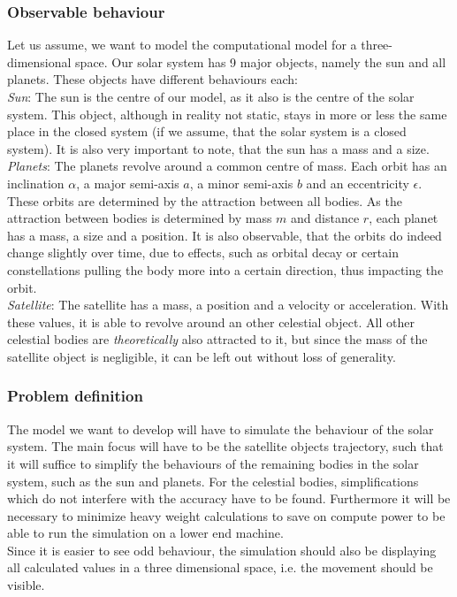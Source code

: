 \documentclass[conference,compsoc]{IEEEtran}
\begin{document}
\subsubsection{Observable behaviour}
\label{observations}
Let us assume, we want to model the computational model for a three-dimensional space. Our solar system has 9 major objects, namely the sun and all planets. These objects have different behaviours each:\\
\emph{Sun}: The sun is the centre of our model, as it also is the centre of the solar system. This object, although in reality not static, stays in more or less the same place in the closed system (if we assume, that the solar system is a closed system). It is also very important to note, that the sun has a mass and a size.\\
\emph{Planets}: The planets revolve around a common centre of mass. Each orbit has an inclination $\alpha$, a major semi-axis $a$, a minor semi-axis $b$ and an eccentricity $\epsilon$. 
These orbits are determined by the attraction between all bodies. As the attraction between bodies is determined by mass $m$ and distance $r$, each planet has a mass, a size and a position. It is also observable, that the orbits do indeed change slightly over time, due to effects, such as orbital decay or certain constellations pulling the body more into a certain direction, thus impacting the orbit.\\
\emph{Satellite}: The satellite has a mass, a position and a velocity or acceleration. With these values, it is able to revolve around an other celestial object. All other celestial bodies are \emph{theoretically} also attracted to it, but since the mass of the satellite object is negligible, it can be left out without loss of generality.
\subsubsection{Problem definition}
\label{Problem-Def}
The model we want to develop will have to simulate the behaviour of the solar system. The main focus will have to be the satellite objects trajectory, such that it will suffice to simplify the behaviours of the remaining bodies in the solar system, such as the sun and planets. For the celestial bodies, simplifications which do not interfere with the accuracy have to be found. Furthermore it will be necessary to minimize heavy weight calculations to save on compute power to be able to run the simulation on a lower end machine. \\
Since it is easier to see odd behaviour, the simulation should also be displaying all calculated values in a three dimensional space, i.e. the movement should be visible.
\end{document}
